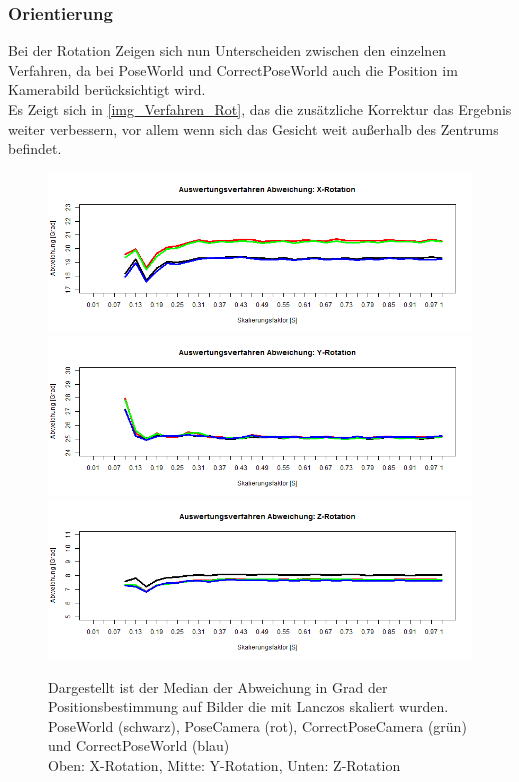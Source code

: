 \subsubsection{Orientierung}
Bei der Rotation Zeigen sich nun Unterscheiden zwischen den einzelnen Verfahren, da bei PoseWorld und CorrectPoseWorld auch die Position im Kamerabild berücksichtigt wird.\\
Es Zeigt sich in \autoref{img_Verfahren_Rot}, das die zusätzliche Korrektur das Ergebnis weiter verbessern, vor allem wenn sich das Gesicht weit außerhalb des Zentrums befindet.
\begin{figure}
	\centering
	\includegraphics[width=\linewidth]{img_Skalierung/Verfahren_RX}
	\includegraphics[width=\linewidth]{img_Skalierung/Verfahren_RY}
	\includegraphics[width=\linewidth]{img_Skalierung/Verfahren_RZ}
	\caption{Dargestellt ist der Median der Abweichung in Grad der Positionsbestimmung auf Bilder die mit Lanczos skaliert wurden.\\
		PoseWorld (schwarz), PoseCamera (rot), CorrectPoseCamera (grün) und CorrectPoseWorld (blau)\\
		Oben: X-Rotation, Mitte: Y-Rotation, Unten: Z-Rotation}
	\label{img_Verfahren_Rot}
\end{figure}
